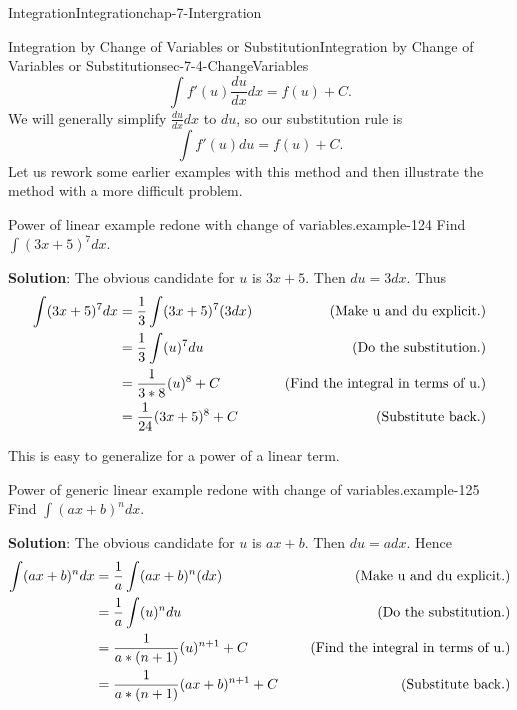 \documentclass[oneside,10pt,]{book}
\newcommand{\terminology}[1]{\textbf{#1}}
\numberwithin{equation}{section}
\newcommand{\amp}{&}
\begin{document}
\begin{chapterptx}{Integration}{}{Integration}{}{}{chap-7-Intergration}
\begin{sectionptx}{Integration by Change of Variables or Substitution}{}{Integration by Change of Variables or Substitution}{}{}{sec-7-4-ChangeVariables}
\begin{equation*}
\int f' (u)  \frac{du}{dx}  dx=f(u)+C.
\end{equation*}
\hypertarget{p-2836}{}%
We will generally simplify \(\frac{du}{dx} dx\) to \(du\), so our substitution rule is%
%
\begin{equation*}
\int f' (u)du=f(u)+C.
\end{equation*}
\hypertarget{p-2837}{}%
Let us rework some earlier examples with this method and then illustrate the method with a more difficult problem.%
\begin{example}{Power of linear example redone with change of variables.}{example-124}%
\hypertarget{p-2838}{}%
Find \(\int (3x+5)^7 dx\).%
\par
\hypertarget{p-2839}{}%
\terminology{Solution}:  The obvious candidate for \(u\) is \(3x+5\).  Then \(du=3dx\).  Thus%
%
\begin{equation*}
\begin{aligned}  \int (3x+5)^7  dx
\amp =\frac{1}{3} \int (3x+5)^7  (3dx)
\amp \quad \hbox{ (Make u and du explicit.)}\\ 
\amp =\frac{1}{3} \int (u)^7  du
\amp \quad \hbox{ (Do the substitution.)}\\ 
\amp =\frac{1}{3*8} (u)^8+C
\amp \quad \hbox{ (Find the integral in terms of u.)}\\ 
\amp =\frac{1}{24} (3x+5)^8+C
\amp \quad \hbox{ (Substitute back.)}\\ 
\end{aligned}
\end{equation*}
\end{example}
\hypertarget{p-2840}{}%
This is easy to generalize for a power of a linear term.%
\begin{example}{Power of generic linear example redone with change of variables.}{example-125}%
\hypertarget{p-2841}{}%
Find \(\int (ax+b)^n dx\).%
\par
\hypertarget{p-2842}{}%
\terminology{Solution}:  The obvious candidate for \(u\) is \(ax+b\).  Then \(du=a dx\).  Hence%
%
\begin{equation*}
\begin{aligned}  \int (ax+b)^n dx
\amp =\frac{1}{a} \int (ax+b)^n  (dx)
\amp \quad \hbox{ (Make u and du explicit.)}\\ 
\amp =\frac{1}{a} \int (u)^n  du
\amp \quad \hbox{ (Do the substitution.)}\\ 
\amp =\frac{1}{a*(n+1)} (u)^{n+1}+C
\amp \quad \hbox{ (Find the integral in terms of u.)}\\ 
\amp =\frac{1}{a*(n+1)} (ax+b)^{n+1}+C
\amp \quad \hbox{ (Substitute back.)}\\ 

\end{aligned}
\end{equation*}
\end{example}
\end{sectionptx}
\end{chapterptx}
\end{document}
